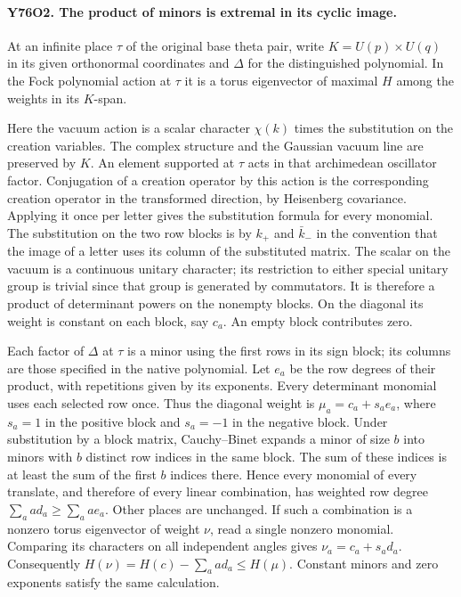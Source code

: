 \paragraph{Y76O2. The product of minors is extremal in its cyclic image.}
At an infinite place $\tau$ of the original base theta pair,
write $K=U(p)\times U(q)$ in its given orthonormal coordinates
and $\Delta$ for the distinguished polynomial. In the Fock
polynomial action at $\tau$ it is a torus eigenvector of maximal
$H$ among the weights in its $K$-span.

Here the vacuum action is a scalar character $\chi(k)$ times
the substitution on the creation variables. The complex structure
and the Gaussian vacuum line are preserved by $K$. An element
supported at $\tau$ acts in that archimedean oscillator factor.
Conjugation of a creation operator by this action is the
corresponding creation operator in the transformed direction,
by Heisenberg covariance. Applying it once per letter gives
the substitution formula for every monomial. The substitution
on the two row blocks is by $k_+$ and $\bar k_-$ in the convention
that the image of a letter uses its column of the substituted
matrix. The scalar on the vacuum is a continuous unitary
character; its restriction to either special unitary group
is trivial since that group is generated by commutators.
It is therefore a product of determinant powers on the
nonempty blocks. On the diagonal its weight is constant on each
block, say $c_a$. An empty block contributes zero.

Each factor of $\Delta$ at $\tau$ is a minor using the first
rows in its sign block; its columns are those specified in
the native polynomial. Let $e_a$ be the row degrees of their
product, with repetitions given by its exponents. Every
determinant monomial uses each selected row once. Thus the
diagonal weight is $\mu_a=c_a+s_ae_a$, where $s_a=1$ in the
positive block and $s_a=-1$ in the negative block. Under
substitution by a block matrix, Cauchy--Binet expands a minor
of size $b$ into minors with $b$ distinct row indices in the
same block. The sum of these indices is at least the sum of
the first $b$ indices there. Hence every monomial of every
translate, and therefore of every linear combination, has
weighted row degree $\sum_a a d_a\ge\sum_a a e_a$. Other
places are unchanged. If such a combination is a nonzero
torus eigenvector of weight $\nu$, read a single nonzero
monomial. Comparing its characters on all independent angles
gives $\nu_a=c_a+s_a d_a$. Consequently
$H(\nu)=H(c)-\sum_a a d_a\le H(\mu)$. Constant minors and
zero exponents satisfy the same calculation.

